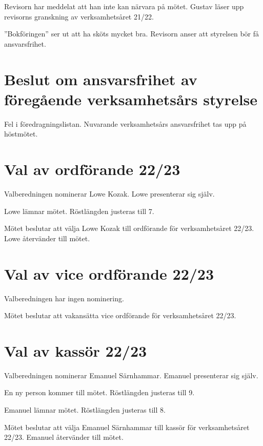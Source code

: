 \documentclass[a4paper]{article}
\newenvironment{quotationb}%
{\begin{leftbar}}%
{\end{leftbar}}
\begin{document}
Revisorn har meddelat att han inte kan närvara på mötet. Gustav läser upp
revisorns granskning av verksamhetsåret 21/22.

\begin{quotationb}

''Bokföringen'' ser ut att ha sköts mycket bra. Revisorn anser att styrelsen bör
    få ansvarsfrihet.

\end{quotationb}

\section{Beslut om ansvarsfrihet av föregående verksamhetsårs styrelse}

Fel i föredragningslistan. Nuvarande verksamhetsårs ansvarsfrihet tas upp på
höstmötet.

\section{Val av ordförande 22/23}

Valberedningen nominerar Lowe Kozak. Lowe presenterar sig själv.

Lowe lämnar mötet. Röstlängden justeras till 7.

Mötet beslutar att välja Lowe Kozak till ordförande för verksamhetsåret 22/23. Lowe
återvänder till mötet.

\section{Val av vice ordförande 22/23}

Valberedningen har ingen nominering.

Mötet beslutar att vakansätta vice ordförande för verksamhetsåret 22/23.

\section{Val av kassör 22/23}

Valberedningen nominerar Emanuel Särnhammar. Emanuel presenterar sig själv.

En ny person kommer till mötet. Röstlängden justeras till 9.

Emanuel lämnar mötet. Röstlängden justeras till 8.

Mötet beslutar att välja Emanuel Särnhammar till kassör för verksamhetsåret 22/23. Emanuel
återvänder till mötet.
\end{document}
